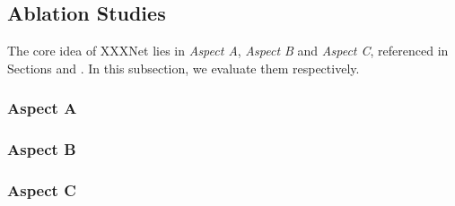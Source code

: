
\subsection{Ablation Studies}

The core idea of XXXNet lies in \emph{Aspect A}, \emph{Aspect B} 
and \emph{Aspect C}, referenced in Sections \missref and \missref. 
In this subsection, we evaluate them respectively.

\subsubsection{Aspect A}

\subsubsection{Aspect B}

\subsubsection{Aspect C}


